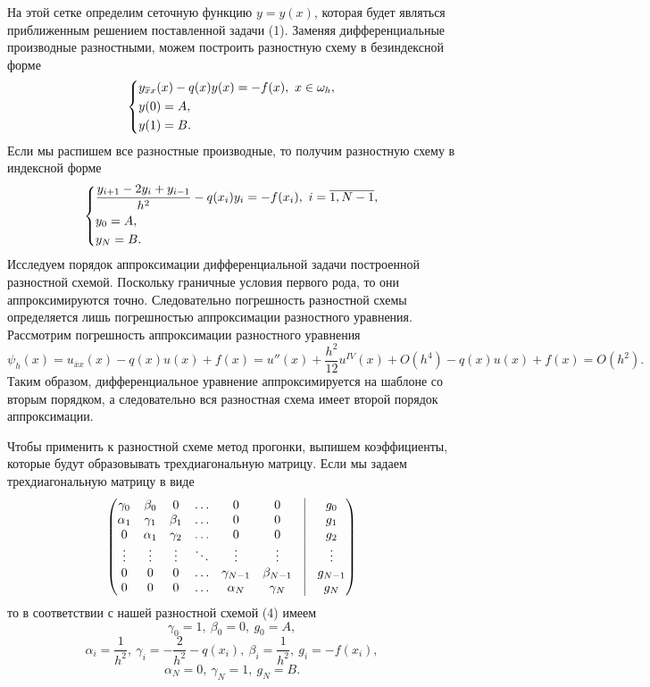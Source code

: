 \documentclass[a4paper, 12pt]{article}
\begin{document}
    На этой сетке определим сеточную функцию \(y = y(x)\), которая будет
являться приближенным решением поставленной задачи (1). Заменяя
дифференциальные производные разностными, можем построить разностную
схему в безиндексной форме \begin{equation}
        \begin{dcases}
        y_{\overline x x}(x) - q(x) y(x) = -f(x),\ x \in \omega_h,\\
        y(0) = A,\\
        y(1) = B.
        \end{dcases}
    \end{equation} Если мы распишем все разностные производные, то
получим разностную схему в индексной форме \begin{equation}
        \begin{dcases}
            \dfrac{y_{i+1} - 2y_i + y_{i-1}}{h^2} - q(x_i) y_i = -f(x_i),\ i = \overline{1, N-1},\\
            y_0 = A,\\
            y_N = B.
        \end{dcases}
    \end{equation} Исследуем порядок аппроксимации дифференциальной
задачи построенной разностной схемой. Поскольку граничные условия
первого рода, то они аппроксимируются точно. Следовательно погрешность
разностной схемы определяется лишь погрешностью аппроксимации
разностного уравнения. Рассмотрим погрешность аппроксимации разностного
уравнения \[
    \psi_{h}(x) = u_{\overline x x}(x) - q(x)u(x) + f(x) = u''(x) + \dfrac{h^2}{12}u^{IV}(x) + O(h^4) - q(x)u(x) + f(x) = O(h^2).
    \] Таким образом, дифференциальное уравнение аппроксимируется на
шаблоне со вторым порядком, а следовательно вся разностная схема имеет
второй порядок аппроксимации.

Чтобы
применить к разностной схеме метод прогонки, выпишем коэффициенты,
которые будут образовывать трехдиагональную матрицу. Если мы задаем
трехдиагональную матрицу в виде \begin{equation}
        \begin{pmatrix} 
            \gamma_0 & \beta_0 & 0 & \ldots & 0 & 0 & \vrule & g_0 \\ 
            \alpha_1 & \gamma_1 & \beta_1 & \ldots & 0 & 0 & \vrule & g_1\\ 
            0 & \alpha_1 & \gamma_2 & \ldots & 0 & 0 & \vrule & g_2\\ 
            \vdots & \vdots & \vdots & \ddots & \vdots & \vdots & \vrule & \vdots\\ 
            0 & 0 & 0 & \ldots& \gamma_{N-1} & \beta_{N-1} & \vrule & g_{N-1} \\ 
            0 & 0 & 0 & \ldots& \alpha_N& \gamma_N & \vrule & g_N\\\end{pmatrix}
    \end{equation} то в соответствии с нашей разностной схемой (4) имеем
\[\gamma_0 = 1,\ \beta_0 = 0,\ g_0 = A,\]
\[\alpha_i = \dfrac{1}{h^2},\ \gamma_i = -\dfrac{2}{h^2} - q(x_i), \ \beta_i =\dfrac{1}{h^2},\ g_i = -f(x_i),\]
\[\alpha_N = 0,\ \gamma_N = 1,\ g_N = B.\]
\end{document}
